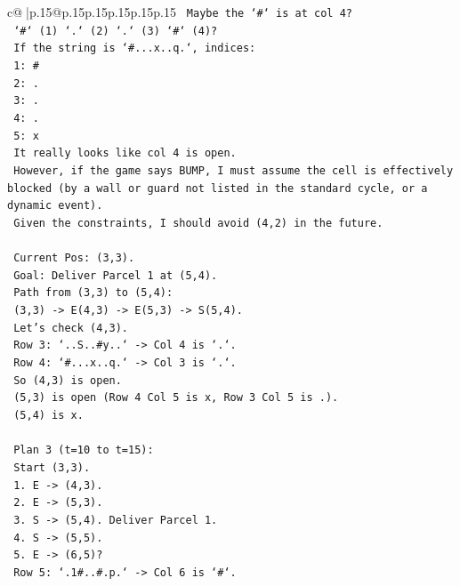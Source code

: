 \documentclass{article}
\begin{document}
{\begin{supertabular}{c@{$\;$}|p{.15\linewidth}@{}p{.15\linewidth}p{.15\linewidth}p{.15\linewidth}p{.15\linewidth}p{.15\linewidth}}
{{{\texttt{      Maybe the `\#` is at col 4?} \\
\texttt{      `\#` (1) `.` (2) `.` (3) `\#` (4)?} \\
\texttt{      If the string is `\#...x..q.`, indices:} \\
\texttt{      1: \#} \\
\texttt{      2: .} \\
\texttt{      3: .} \\
\texttt{      4: .} \\
\texttt{      5: x} \\
\texttt{      It really looks like col 4 is open.} \\
\texttt{      However, if the game says BUMP, I must assume the cell is effectively blocked (by a wall or guard not listed in the standard cycle, or a dynamic event).} \\
\texttt{      Given the constraints, I should avoid (4,2) in the future.} \\
\\ 
\texttt{      Current Pos: (3,3).} \\
\texttt{      Goal: Deliver Parcel 1 at (5,4).} \\
\texttt{      Path from (3,3) to (5,4):} \\
\texttt{      (3,3) {-}> E(4,3) {-}> E(5,3) {-}> S(5,4).} \\
\texttt{      Let's check (4,3).} \\
\texttt{      Row 3: `..S..\#y..` {-}> Col 4 is `.`.} \\
\texttt{      Row 4: `\#...x..q.` {-}> Col 3 is `.`.} \\
\texttt{      So (4,3) is open.} \\
\texttt{      (5,3) is open (Row 4 Col 5 is x, Row 3 Col 5 is .).} \\
\texttt{      (5,4) is x.} \\
\\ 
\texttt{      Plan 3 (t=10 to t=15):} \\
\texttt{      Start (3,3).} \\
\texttt{      1. E {-}> (4,3).} \\
\texttt{      2. E {-}> (5,3).} \\
\texttt{      3. S {-}> (5,4). Deliver Parcel 1.} \\
\texttt{      4. S {-}> (5,5).} \\
\texttt{      5. E {-}> (6,5)?} \\
\texttt{         Row 5: `.1\#..\#.p.` {-}> Col 6 is `\#`.} \\
}}}
\end{supertabular}}
\end{document}
